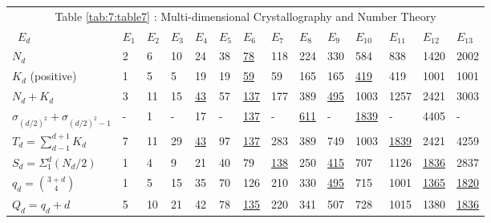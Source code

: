 \documentclass[a4paper,9pt]{article}
\newcounter{col}
\begin{document}
\begin{table}
  \hskip-0.0cm\begin{tabular}{llllllllllllll}
    \toprule
    \multicolumn{14}{c}{Table \ref{tab:7:table7} : Multi-dimensional Crystallography and Number Theory}                  \\
    \cmidrule(r){1-14}
      
      \ $E_d$  & $E_1 $ & $E_2$ & $E_3 $& $E_4$ &$ E_5$ &$ E_6 $&$ E_7$ &$ E_8$ & $E_9$ &$ E_{10} $&$ E_{11} $&$ E_{12}$&$ E_{13}$ \\
    \midrule
    
    $N_d$ & 2 & 6 & 10 & 24 & 38 & \underline{78} & 118 & 224 & 330 & 584 & 838 & 1420 & 2002  \\
       
    $K_d$ (positive)  & 1 & 5 & 5 & 19 & 19 & \underline{59} & 59 & 165 & 165& \underline{419} & 419 & 1001 & 1001 \\
    
    
    
    
    
     $N_d + K_d$  & 3 & 11 & 15 & \underline{43} & 57 & \underline{137} & 177 & 389 & \underline{495} &  1003 & 1257 & 2421 & 3003 \\
    
    
    
    $\sigma_{(d/2)^2} + \sigma_{(d/2)^2-1}$  & - & 1 & -& 17 & - & \underline{137} & - & \underline{611} & - &  \underline{1839} &   - & 4405 & -\\
    
    $T_d =\sum_{d-1}^{d+1}K_d$   & 7 & 11 & 29 & \underline{43} & 97 & \underline{137} & 283 & 389 & 749 & 1003 & \underline{1839} & 2421 & 4259 \\
    
    $S_d=\Sigma_1^d (N_d/2)$   & 1 & 4 & 9 & 21 & 40 & 79 & \underline{138} & 250 & \underline{415} & 707 & 1126 & \underline{1836} & 2837 \\
    
    
     $q_d=\binom{3+d}{4}$   & 1 & 5 & 15 & 35 & 70 & 126 & 210 & 330 & \underline {495} & 715 & 1001 &\underline{1365}& \underline{1820}\\
     
     
     
     
     $Q_d=q_d + d$    & 5 & 10 & 21 & 42 & 78 & \underline{135} & 220 & 341 & 507 & 728 & 1015 & 1380 & \underline{1836}\\
    
     

\end{tabular}
\end{table}
\end{document}
